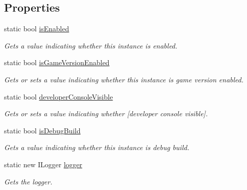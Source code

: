 \subsection*{Properties}
\begin{DoxyCompactItemize}
\item 
static bool \hyperlink{class_lerp2_a_p_i_1_1___debug_1_1_debug_a51428994a9c91e0f350452ed3fb286ee}{is\+Enabled}
\begin{DoxyCompactList}\small\item\em Gets a value indicating whether this instance is enabled. \end{DoxyCompactList}\item 
static bool \hyperlink{class_lerp2_a_p_i_1_1___debug_1_1_debug_a5b7b497d861dedced5e0cee21e9becf4}{is\+Game\+Version\+Enabled}
\begin{DoxyCompactList}\small\item\em Gets or sets a value indicating whether this instance is game version enabled. \end{DoxyCompactList}\item 
static bool \hyperlink{class_lerp2_a_p_i_1_1___debug_1_1_debug_a3792567853ce310c0ef945bfa20de460}{developer\+Console\+Visible}
\begin{DoxyCompactList}\small\item\em Gets or sets a value indicating whether \mbox{[}developer console visible\mbox{]}. \end{DoxyCompactList}\item 
static bool \hyperlink{class_lerp2_a_p_i_1_1___debug_1_1_debug_a9d591ddae624a8337881ad2a08b8e4be}{is\+Debug\+Build}
\begin{DoxyCompactList}\small\item\em Gets a value indicating whether this instance is debug build. \end{DoxyCompactList}\item 
static new I\+Logger \hyperlink{class_lerp2_a_p_i_1_1___debug_1_1_debug_a082a2c3e38f54daeeeaaa441927b07c3}{logger}
\begin{DoxyCompactList}\small\item\em Gets the logger. \end{DoxyCompactList}\end{DoxyCompactItemize}

